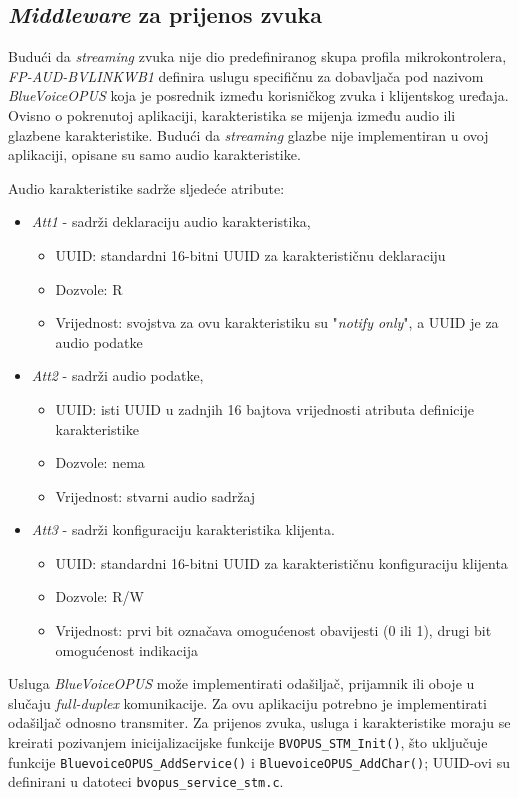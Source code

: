 \subsection{\textit{Middleware} za prijenos zvuka}

Budući da \textit{streaming} zvuka nije dio predefiniranog skupa profila mikrokontrolera, \textit{FP-AUD-BVLINKWB1} definira uslugu specifičnu za dobavljača pod nazivom \textit{BlueVoiceOPUS} koja je posrednik između korisničkog zvuka i  klijentskog uređaja. Ovisno o pokrenutoj aplikaciji, karakteristika se mijenja između audio ili glazbene karakteristike. Budući da \textit{streaming} glazbe nije implementiran u ovoj aplikaciji, opisane su samo audio karakteristike. 

Audio karakteristike sadrže sljedeće atribute:
\begin{itemize}
	\item \textit{Att1} - sadrži deklaraciju audio karakteristika,
	\begin{itemize}
		\item UUID: standardni 16-bitni UUID za karakterističnu deklaraciju
		\item Dozvole: R
		\item Vrijednost: svojstva za ovu karakteristiku su "\textit{notify only}", a UUID je za audio podatke
	\end{itemize}
	\item \textit{Att2} - sadrži audio podatke,
	\begin{itemize}
		\item UUID: isti UUID u zadnjih 16 bajtova vrijednosti atributa definicije karakteristike
		\item Dozvole: nema
		\item Vrijednost: stvarni audio sadržaj
	\end{itemize}
	\item \textit{Att3} - sadrži konfiguraciju karakteristika klijenta.
	\begin{itemize}
		\item UUID: standardni 16-bitni UUID za karakterističnu konfiguraciju klijenta
		\item Dozvole: R/W
		\item Vrijednost: prvi bit označava omogućenost obavijesti (0 ili 1), drugi bit omogućenost indikacija
	\end{itemize}
\end{itemize}

Usluga \textit{BlueVoiceOPUS} može implementirati odašiljač, prijamnik ili oboje u slučaju \textit{full-duplex} komunikacije. Za ovu aplikaciju potrebno je implementirati odašiljač odnosno transmiter.
Za prijenos zvuka, usluga i karakteristike moraju se kreirati pozivanjem inicijalizacijske funkcije \lstinline|BVOPUS_STM_Init()|, što uključuje funkcije \newline \lstinline|BluevoiceOPUS_AddService()| i \lstinline|BluevoiceOPUS_AddChar()|; UUID-ovi su definirani u datoteci \lstinline|bvopus_service_stm.c|.

